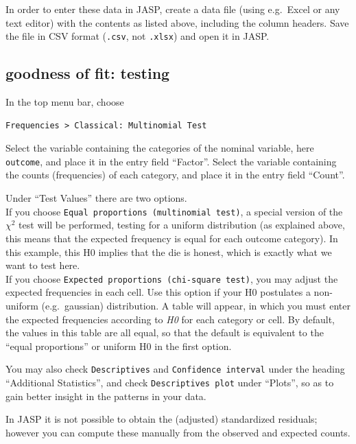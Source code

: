 \documentclass[
]{book}
\begin{document}
In order to enter these data in JASP, create a data file (using e.g.~Excel or any text editor) with the contents as listed above, including the column headers. Save the file in CSV format (\texttt{.csv}, not \texttt{.xlsx}) and open it in JASP.

\hypertarget{goodness-of-fit-testing-1}{%
\subsection{goodness of fit: testing}\label{goodness-of-fit-testing-1}}

In the top menu bar, choose

\begin{verbatim}
Frequencies > Classical: Multinomial Test
\end{verbatim}

Select the variable containing the categories of the nominal variable, here \texttt{outcome}, and place it in the entry field ``Factor''.
Select the variable containing the counts (frequencies) of each category, and place it in the entry field ``Count''.

Under ``Test Values'' there are two options.\\
If you choose \texttt{Equal\ proportions\ (multinomial\ test)}, a special version of the \(\chi^2\) test will be performed, testing for a uniform distribution (as explained above, this means that the expected frequency is equal for each outcome category). In this example, this H0 implies that the die is honest, which is exactly what we want to test here.\\
If you choose \texttt{Expected\ proportions\ (chi-square\ test)}, you may adjust the expected frequencies in each cell. Use this option if your H0 postulates a non-uniform (e.g.~gaussian) distribution. A table will appear, in which you must enter the expected frequencies according to \emph{H0} for each category or cell. By default, the values in this table are all equal, so that the default is equivalent to the ``equal proportions'' or uniform H0 in the first option.

You may also check \texttt{Descriptives} and \texttt{Confidence\ interval} under the heading ``Additional Statistics'', and check \texttt{Descriptives\ plot} under ``Plots'', so as to gain better insight in the patterns in your data.

In JASP it is not possible to obtain the (adjusted) standardized residuals; however you can compute these manually from the observed and expected counts.
\end{document}
